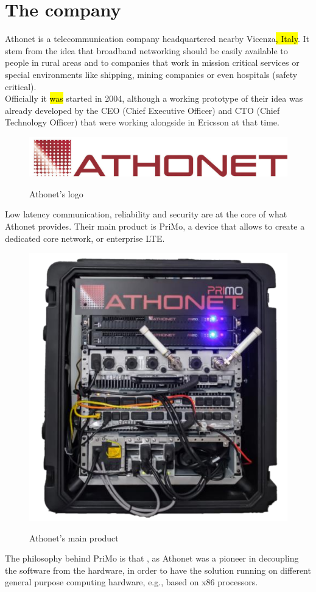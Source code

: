 \section{The company}
	Athonet\cite{athonet} is a telecommunication company headquartered nearby Vicenza\hl{, Italy}.
	It stem from the idea that broadband networking should be easily available to people in rural areas and to companies that work in mission critical services or special environments like shipping, mining companies or even hospitals (safety critical).\\
	Officially it \hl{was} started in 2004, although a working prototype of their idea was already developed by the CEO (Chief Executive Officer) and CTO (Chief Technology Officer) that were working alongside in Ericsson\cite{ericsson} at that time.
	\begin{figure}[H]
		\centering
		\includegraphics[width=.7\textwidth]{resources/ath_logo}\\
		\caption[Athonet's logo]{Athonet's logo}
	\end{figure}
	Low latency communication, reliability and security are at the core of what Athonet provides.
	Their main product is PriMo, a device that allows to create a dedicated core network, or enterprise LTE.
	\begin{figure}[H]
		\centering
		\includegraphics[width=.5\textwidth]{resources/gianluca_primo}\\
		\caption[]{Athonet's main product \textbf{}\cite{gianluca_primo}}
	\end{figure}
	The philosophy behind PriMo is that , as Athonet was a pioneer in decoupling the software from the hardware, in order to have the solution running on different general purpose computing hardware, e.g., based on x86 processors.\\
